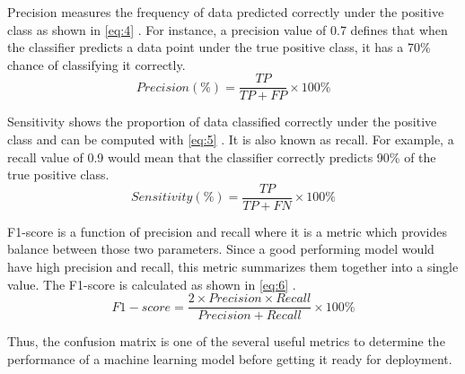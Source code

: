 Precision measures the frequency of data predicted correctly under the positive class as shown in \ref{eq:4} \cite{metrics}. For instance, a precision value of 0.7 defines that when the classifier predicts a data point under the true positive class, it has a 70\% chance of classifying it correctly.
\begin{equation}
    Precision(\%) = \frac{TP}{TP+FP} \times100\% 
    \label{eq:4}
\end{equation}

Sensitivity shows the proportion of data classified correctly under the positive class and can be computed  with \ref{eq:5} \cite{metrics}. It is also known as recall. For example, a recall value of 0.9 would mean that the classifier correctly predicts 90\% of the true positive class. 
\begin{equation}
    Sensitivity(\%) = \frac{TP}{TP+FN} \times100\% 
    \label{eq:5}
\end{equation}

F1-score is a function of precision and recall where it is a metric which provides balance between those two parameters. Since a good performing model would have high precision and recall, this metric summarizes them together into a single value. The F1-score is calculated as shown in \ref{eq:6} \cite{metrics}.
\begin{equation}
   F1-score = \frac{2\times Precision\times Recall}{Precision+Recall} \times100\% 
    \label{eq:6}
\end{equation} 

Thus, the confusion matrix is one of the several useful metrics to determine the performance of a machine learning model before getting it ready for deployment.



